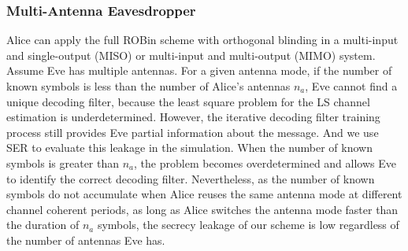 \subsubsection{Multi-Antenna Eavesdropper}
Alice can apply the full ROBin scheme with orthogonal blinding in a multi-input and single-output (MISO) or multi-input and multi-output (MIMO) system. Assume Eve has multiple antennas. 
For a given antenna mode, if the number of known symbols is less than the number of Alice's antennas $n_a$, Eve cannot find a unique decoding filter, because the least square problem for the LS channel estimation is underdetermined. However, the iterative decoding filter training process still provides Eve partial information about the message. And we use SER to evaluate this leakage in the simulation. When the number of known symbols is greater than $n_a$, the problem becomes overdetermined and allows Eve to identify the correct decoding filter. Nevertheless, as the number of known symbols do not accumulate when Alice reuses the same antenna mode at different channel coherent periods, as long as Alice switches the antenna mode faster than the duration of $n_a$ symbols, the secrecy leakage of our scheme is low regardless of the number of antennas Eve has.

